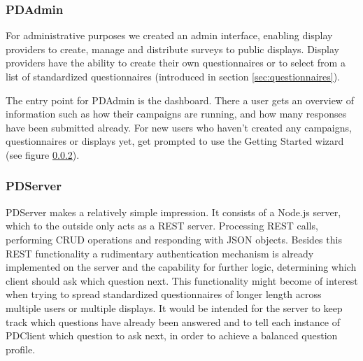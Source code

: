 	\subsubsection{PDAdmin}

		For administrative purposes we created an admin interface, enabling display providers to create, manage and distribute surveys to public displays. 		Display providers have the ability to create their own questionnaires or to select from a list of standardized questionnaires (introduced in section \ref{sec:questionnaires}).

		The entry point for PDAdmin is the dashboard. There a user gets an overview of information such as how their campaigns are running, and how many responses have been submitted already. 
		For new users who haven't created any campaigns, questionnaires or displays yet, get prompted to use the Getting Started wizard (see figure \ref{}).



			





	\subsubsection{PDServer}

		PDServer makes a relatively simple impression. It consists of a Node.js server, which to the outside only acts as a REST server. Processing REST calls, performing CRUD operations and responding with JSON objects. Besides this REST functionality a rudimentary authentication mechanism is already implemented on the server and the capability for further logic, determining which client should ask which question next. This functionality might become of interest when trying to spread standardized questionnaires of longer length across multiple users or multiple displays. It would be intended for the server to keep track which questions have already been answered and to tell each instance of PDClient which question to ask next, in order to achieve a balanced question profile.


